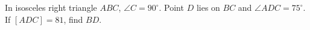 In isosceles right triangle $ABC$, $\angle C=90^\circ$. Point $D$ lies on $BC$ and $\angle ADC=75^\circ$. If $[ADC]=81$, find $BD$.
